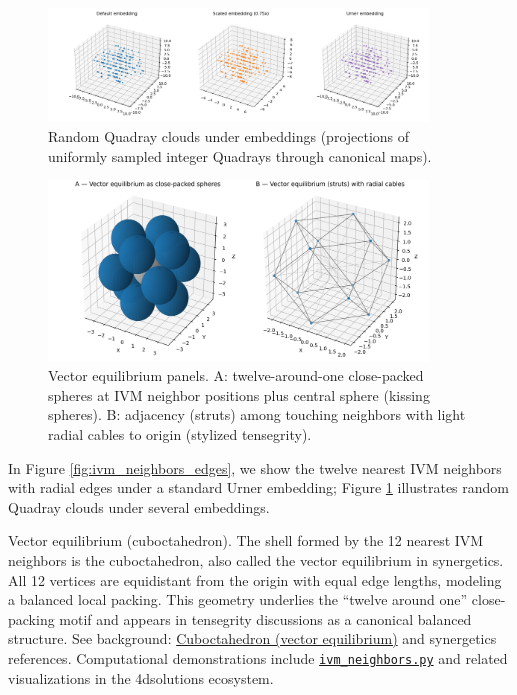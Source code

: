 \documentclass[
  10pt,
]{article}
\begin{document}
\begin{figure}[htbp]
\centering
\includegraphics[width=0.9\textwidth]{figures/quadray_clouds.png}
\caption{Random Quadray clouds under embeddings (projections of uniformly sampled integer Quadrays through canonical maps).}
\label{fig:quadray_clouds}
\end{figure}

\begin{figure}[htbp]
\centering
\includegraphics[width=0.9\textwidth]{figures/vector_equilibrium_panels.png}
\caption{Vector equilibrium panels. A: twelve-around-one close-packed spheres at IVM neighbor positions plus central sphere (kissing spheres). B: adjacency (struts) among touching neighbors with light radial cables to origin (stylized tensegrity).}
\label{fig:vector_equilibrium}
\end{figure}

In Figure \ref{fig:ivm_neighbors_edges}, we show the twelve nearest IVM
neighbors with radial edges under a standard Urner embedding; Figure
\ref{fig:quadray_clouds} illustrates random Quadray clouds under several
embeddings.

Vector equilibrium (cuboctahedron). The shell formed by the 12 nearest
IVM neighbors is the cuboctahedron, also called the vector equilibrium
in synergetics. All 12 vertices are equidistant from the origin with
equal edge lengths, modeling a balanced local packing. This geometry
underlies the ``twelve around one'' close-packing motif and appears in
tensegrity discussions as a canonical balanced structure. See
background:
\href{https://en.wikipedia.org/wiki/Cuboctahedron}{Cuboctahedron (vector
equilibrium)} and synergetics references. Computational demonstrations
include
\href{https://github.com/4dsolutions/School_of_Tomorrow/blob/master/quadcraft.py}{\texttt{ivm\_neighbors.py}}
and related visualizations in the 4dsolutions ecosystem.
\end{document}
